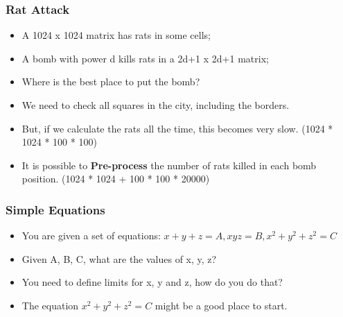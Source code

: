 \begin{frame}
  \frametitle{Rat Attack}

  {\small
    \begin{block}{}
      \begin{itemize}
      \item A 1024 x 1024 matrix has rats in some cells;
      \item A bomb with power d kills rats in a 2d+1 x 2d+1 matrix;
      \item Where is the best place to put the bomb?
      \end{itemize}
    \end{block}
    \begin{itemize}
    \item We need to check all squares in the city, including the borders.
    \item But, if we calculate the rats all the time, this becomes very slow.
      (1024 * 1024 * 100 * 100)
    \item It is possible to {\bf Pre-process} the number of rats killed in each bomb position. (1024 * 1024 + 100 * 100 * 20000)
    \end{itemize}
  }
\end{frame}

\begin{frame}
  \frametitle{Simple Equations}

  {\small
  \begin{block}{}
    \begin{itemize}
    \item You are given a set of equations: $x + y + z = A, xyz = B, x^2 + y^2 + z^2 = C$
    \item Given A, B, C, what are the values of x, y, z?
    \end{itemize}
  \end{block}

  \begin{itemize}
  \item You need to define limits for x, y and z, how do you do that?
  \item The equation $x^2 + y^2 + z^2 = C$ might be a good place to start.
  \end{itemize}
  }
\end{frame}

